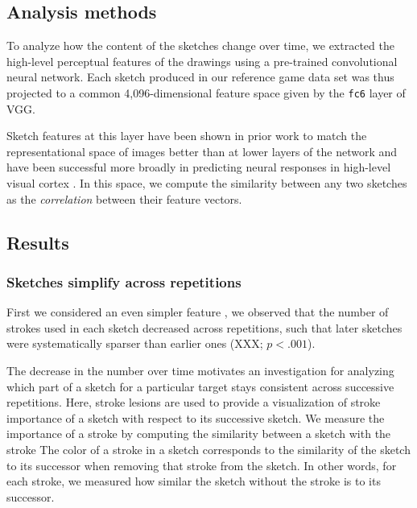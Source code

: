 \documentclass[10pt,letterpaper]{article}
\begin{document}

\subsection{Analysis methods}


To analyze how the content of the sketches change over time, we extracted the high-level perceptual features of the drawings using a pre-trained convolutional neural network. 
Each sketch produced in our reference game data set was thus projected to a common 4,096-dimensional feature space given by the \texttt{fc6} layer of VGG. 

Sketch features at this layer have been shown in prior work to match the representational space of images better than at lower layers of the network \cite{FanCommon2018} and have been successful more broadly in predicting neural responses in high-level visual cortex \cite{yamins2014performance}.
In this space, we compute the similarity between any two sketches as the \emph{correlation} between their feature vectors.

\subsection{Results}

\subsubsection{Sketches simplify across repetitions}

First we considered an even simpler feature , we observed that the number of strokes used in each sketch decreased across repetitions, such that later sketches were systematically sparser than earlier ones (XXX; $p < .001$). 

The decrease in the number  over time motivates an investigation for analyzing which part of a sketch for a particular target stays consistent across successive repetitions. 
Here, stroke lesions are used to provide a visualization of stroke importance of a sketch with respect to its successive sketch. 
We measure the importance of a stroke by computing the similarity between a sketch with the stroke 
The color of a stroke in a sketch corresponds to the similarity of the sketch to its successor when removing that stroke from the sketch. 
In other words, for each stroke, we measured how similar the sketch without the stroke is to its successor. 
\end{document}
